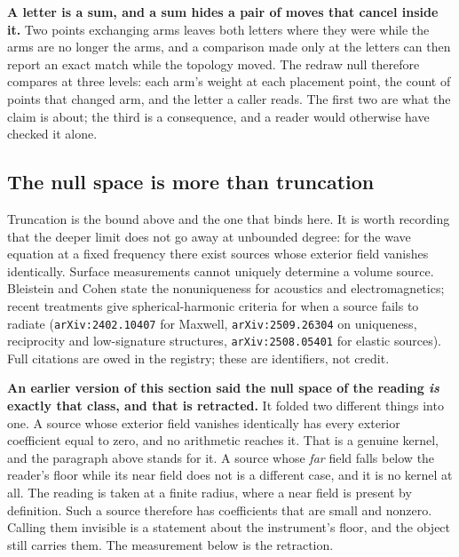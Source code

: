 \textbf{A letter is a sum, and a sum hides a pair of moves that cancel inside it.} Two points exchanging arms leaves both letters where they were while the arms are no longer the arms, and a comparison made only at the letters can then report an exact match while the topology moved. The redraw null therefore compares at three levels: each arm's weight at each placement point, the count of points that changed arm, and the letter a caller reads. The first two are what the claim is about; the third is a consequence, and a reader would otherwise have checked it alone.

\subsection{The null space is more than truncation}

Truncation is the bound above and the one that binds here. It is worth recording that the deeper limit does not go away at unbounded degree: for the wave equation at a fixed frequency there exist sources whose exterior field vanishes identically. Surface measurements cannot uniquely determine a volume source. Bleistein and Cohen state the nonuniqueness for acoustics and electromagnetics; recent treatments give spherical-harmonic criteria for when a source fails to radiate (\texttt{arXiv:2402.10407} for Maxwell, \texttt{arXiv:2509.26304} on uniqueness, reciprocity and low-signature structures, \texttt{arXiv:2508.05401} for elastic sources). Full citations are owed in the registry; these are identifiers, not credit.

\textbf{An earlier version of this section said the null space of the reading \emph{is} exactly that class, and that is retracted.} It folded two different things into one. A source whose exterior field vanishes identically has every exterior coefficient equal to zero, and no arithmetic reaches it. That is a genuine kernel, and the paragraph above stands for it. A source whose \emph{far} field falls below the reader's floor while its near field does not is a different case, and it is no kernel at all. The reading is taken at a finite radius, where a near field is present by definition. Such a source therefore has coefficients that are small and nonzero. Calling them invisible is a statement about the instrument's floor, and the object still carries them. The measurement below is the retraction.

